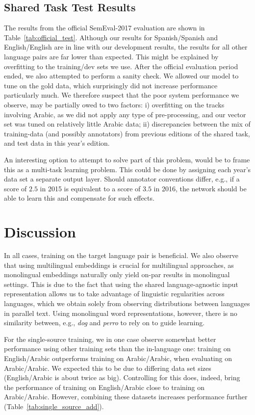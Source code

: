 \documentclass[11pt,a4paper]{article}
\begin{document}
\subsection{Shared Task Test Results}

The results from the official SemEval-2017 evaluation are shown in Table~\ref{tab:official_test}.
Although our results for Spanish/Spanish and English/English are in line with our development results, the results for all other language pairs are far lower than expected.
This might be explained by overfitting to the training/dev sets we use.
After the official evaluation period ended, we also attempted to perform a sanity check.
We allowed our model to tune on the gold data, which surprisingly did not increase performance particularly much.
We therefore suspect that the poor system performance we observe, may be partially owed to two factors:
i) overfitting on the tracks involving Arabic, as we did not apply any type of pre-processing, and our vector set was tuned on relatively little Arabic data;
ii) discrepancies between the mix of training-data (and possibly annotators) from previous editions of the shared task, and test data in this year's edition.

An interesting option to attempt to solve part of this problem, would be to frame this as a multi-task learning problem.
This could be done by assigning each year's data set a separate output layer.
Should annotator conventions differ, e.g., if a score of $2.5$ in 2015 is equivalent to a score of $3.5$ in 2016, the network should be able to learn this and compensate for such effects.


\section{Discussion}

In all cases, training on the target language pair is beneficial.
We also observe that using multilingual embeddings is crucial for multilingual approaches, as monolingual embeddings naturally only yield on-par results in monolingual settings.
This is due to the fact that using the shared language-agnostic input representation allows us to take advantage of linguistic regularities across languages, which we obtain solely from observing distributions between languages in parallel text.
Using monolingual word representations, however, there is no similarity between, e.g., \textit{dog} and \textit{perro} to rely on to guide learning.

For the single-source training, we in one case observe somewhat better performance using other training sets than the in-language one: training on English/Arabic outperforms training on Arabic/Arabic, when evaluating on Arabic/Arabic.
We expected this to be due to differing data set sizes (English/Arabic is about twice as big).
Controlling for this does, indeed, bring the performance of training on English/Arabic close to training on Arabic/Arabic.
However, combining these datasets increases performance further (Table~\ref{tab:single_source_add}).
\end{document}
